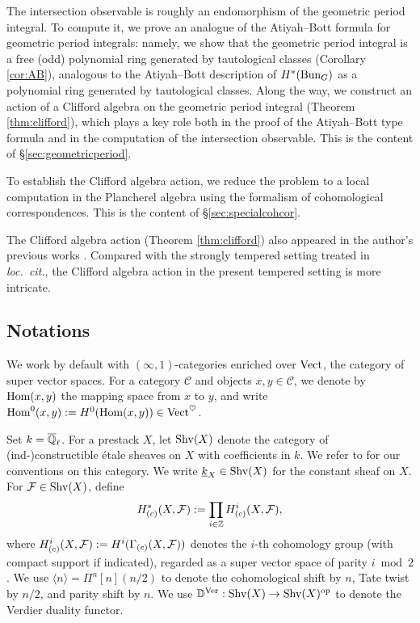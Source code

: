 \documentclass[reqno]{amsart}
\numberwithin{equation}{section}
\numberwithin{equation}{section}
\begin{document}
The intersection observable is roughly an endomorphism of the geometric period integral. To compute it, we prove an analogue of the Atiyah--Bott formula for geometric period integrals: namely, we show that the geometric period integral is a free (odd) polynomial ring generated by tautological classes (Corollary \ref{cor:AB}), analogous to the Atiyah--Bott description of $H^*(\operatorname{Bun}_G)$ as a polynomial ring generated by tautological classes. Along the way, we construct an action of a Clifford algebra on the geometric period integral (Theorem \ref{thm:clifford}), which plays a key role both in the proof of the Atiyah--Bott type formula and in the computation of the intersection observable. This is the content of \S\ref{sec:geometricperiod}.

To establish the Clifford algebra action, we reduce the problem to a local computation in the Plancherel algebra using the formalism of cohomological correspondences. This is the content of \S\ref{sec:specialcohcor}.

The Clifford algebra action (Theorem \ref{thm:clifford}) also appeared in the author's previous works \cite{liu2025higherperiodintegralsderivatives,wang2025specialcycleshtukascategorical}. Compared with the strongly tempered setting treated in \textit{loc.\ cit.}, the Clifford algebra action in the present tempered setting is more intricate.





\subsection{Notations}\label{sec:notation}

We work by default with $(\infty,1)$-categories enriched over $\mathrm{Vect}$, the category of super vector spaces. For a category $\mathcal{C}$ and objects $x,y \in \mathcal{C}$, we denote by $\operatorname{Hom}(x,y)$ the mapping space from $x$ to $y$, and write $\operatorname{Hom}^0(x,y):=H^0(\operatorname{Hom}(x,y))\in \mathrm{Vect}^{\heartsuit}$.

Set $k=\overline{\mathbb{Q}}_\ell$. For a prestack $X$, let $\mathrm{Shv}(X)$ denote the category of (ind-)constructible \'etale sheaves on $X$ with coefficients in $k$. We refer to \cite[\S4.1]{liu2025higherperiodintegralsderivatives} for our conventions on this category. We write $\underline{k}_X\in \mathrm{Shv}(X)$ for the constant sheaf on $X$. For $\mathcal{F}\in \mathrm{Shv}(X)$, define
\[
H^*_{(c)}(X,\mathcal{F}):=\prod_{i\in \mathbb{Z}} H^i_{(c)}(X,\mathcal{F}),
\]
where $H^i_{(c)}(X,\mathcal{F}):=H^i(\Gamma_{(c)}(X,\mathcal{F}))$ denotes the $i$-th cohomology group (with compact support if indicated), regarded as a super vector space of parity $i\bmod 2$. We use $\langle n\rangle=\Pi^n[n](n/2)$ to denote the cohomological shift by $n$, Tate twist by $n/2$, and parity shift by $n$. We use $ \mathbb{D}^{\mathrm{Ver}}:\mathrm{Shv}(X)\to \mathrm{Shv}(X)^{\mathrm{op}}$ to denote the Verdier duality functor.
\end{document}
